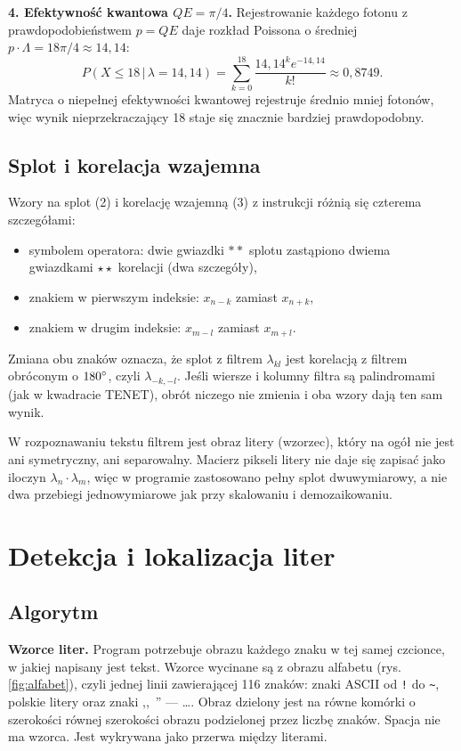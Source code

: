 \documentclass[12pt]{article}
\begin{document}
\textbf{4. Efektywność kwantowa $QE = \pi/4$.} Rejestrowanie każdego fotonu z prawdopodobieństwem $p = QE$ daje rozkład Poissona o średniej $p\cdot\Lambda = 18\pi/4 \approx 14{,}14$:
\[
    P(X \leq 18\,|\,\lambda = 14{,}14) = \sum_{k=0}^{18} \frac{14{,}14^k e^{-14{,}14}}{k!} \approx 0{,}8749.
\]
Matryca o niepełnej efektywności kwantowej rejestruje średnio mniej fotonów, więc wynik nieprzekraczający 18 staje się znacznie bardziej prawdopodobny.

\subsection{Splot i korelacja wzajemna}

Wzory na splot (2) i korelację wzajemną (3) z instrukcji różnią się czterema szczegółami:
\begin{itemize}
    \item symbolem operatora: dwie gwiazdki $\ast\ast$ splotu zastąpiono dwiema gwiazdkami $\star\star$ korelacji (dwa szczegóły),
    \item znakiem w pierwszym indeksie: $x_{n-k}$ zamiast $x_{n+k}$,
    \item znakiem w drugim indeksie: $x_{m-l}$ zamiast $x_{m+l}$.
\end{itemize}
Zmiana obu znaków oznacza, że splot z filtrem $\lambda_{kl}$ jest korelacją z filtrem obróconym o $180\degree$, czyli $\lambda_{-k,-l}$. Jeśli wiersze i kolumny filtra są palindromami (jak w kwadracie TENET), obrót niczego nie zmienia i oba wzory dają ten sam wynik.

W rozpoznawaniu tekstu filtrem jest obraz litery (wzorzec), który na ogół nie jest ani symetryczny, ani separowalny. Macierz pikseli litery nie daje się zapisać jako iloczyn $\lambda_n\cdot\lambda_m$, więc w programie zastosowano pełny splot dwuwymiarowy, a nie dwa przebiegi jednowymiarowe jak przy skalowaniu i demozaikowaniu.

\section{Detekcja i lokalizacja liter} %

\subsection{Algorytm}

\textbf{Wzorce liter.} Program potrzebuje obrazu każdego znaku w tej samej czcionce, w jakiej napisany jest tekst. Wzorce wycinane są z obrazu alfabetu (rys. \ref{fig:alfabet}), czyli jednej linii zawierającej 116 znaków: znaki ASCII od \texttt{!} do \texttt{\~{}}, polskie litery oraz znaki ,,~'' --- \ldots. Obraz dzielony jest na równe komórki o szerokości równej szerokości obrazu podzielonej przez liczbę znaków. Spacja nie ma wzorca. Jest wykrywana jako przerwa między literami.
\end{document}
